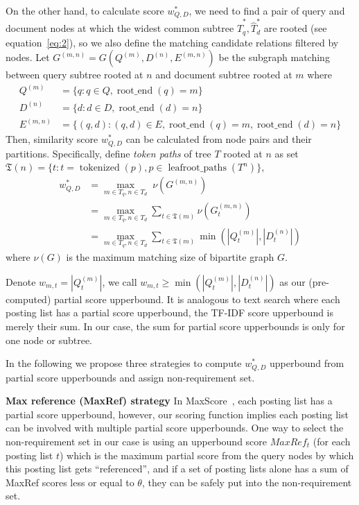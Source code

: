 \documentclass[runningheads]{llncs}
\begin{document}
On the other hand, to calculate score $w^*_{Q, D}$, we need to find a pair of query and document nodes at which the widest common subtree $\hat{T}^*_q, \hat{T}^*_d$ are rooted (see equation~\ref{eq:2}), so we also define the matching candidate relations filtered by nodes.
Let $G^{(m, n)} = G(Q^{(m)}, D^{(n)}, E^{(m, n)})$ be the subgraph matching between query subtree rooted at $n$ and document subtree rooted at $m$  where
$$
\begin{aligned}
Q^{(m)} &= \{ q: q \in Q, \operatorname{root\_end}(q) = m\} \\
D^{(n)} &= \{d: d \in D, \operatorname{root\_end}(d) = n\} \\
E^{(m, n)} &= \{(q, d): (q, d) \in E, \operatorname{root\_end}(q) = m, \operatorname{root\_end}(d) = n\} 
\end{aligned}
$$
Then, similarity score $w^*_{Q, D}$ can be calculated from node pairs and their partitions.
Specifically, define \textit{token paths} of tree $T$ rooted at $n$ as set $\mathfrak{T}(n) = \{t: t = \operatorname{tokenized}(p), p \in \operatorname{leafroot\_paths}(T^n) \}$,
\begin{align}
w^*_{Q, D} &= \max_{m \in T_q, n \in T_d} \; \nu(G^{(m, n)}) \\
           &= \max_{m \in T_q, n \in T_d} \sum_{t \in \mathfrak{T}(m)} \nu(G^{(m, n)}_t) \\
		   \label{eq:5}
           &= \max_{m \in T_q, n \in T_d} \sum_{t \in \mathfrak{T}(m)} \min(|Q^{(m)}_t|, |D^{(n)}_t|)
\end{align}
where $\nu(G)$ is the maximum matching size of bipartite graph $G$.

Denote $w_{m, t} = |Q^{(m)}_t|$, we call $w_{m, t} \ge \min(|Q^{(m)}_t|, |D^{(n)}_t|)$ as our (pre-computed) partial score upperbound.
It is analogous to text search where each posting list has a partial score upperbound, the TF-IDF score upperbound is merely their sum. In our case, the sum for partial score upperbounds is only for one node or subtree.

In the following we propose three strategies to compute $w^*_{Q, D}$ upperbound from partial score upperbounds and assign non-requirement set.

\vspace{0.1in}
\noindent \textbf{Max reference (MaxRef) strategy}\;
In MaxScore~\cite{turtle_flood_1995, strohman_turtle_2005}, each posting list has a partial score upperbound, however, our scoring function implies each posting list can be involved with multiple partial score upperbounds.
One way to select the non-requirement set in our case is using an upperbound score $MaxRef_t$ (for each posting list $t$) which is the maximum partial score from the query nodes by which this posting list gets ``referenced'', and if a set of posting lists alone has a sum of MaxRef scores less or equal to $\theta$, they can be safely put into the non-requirement set.
\end{document}
